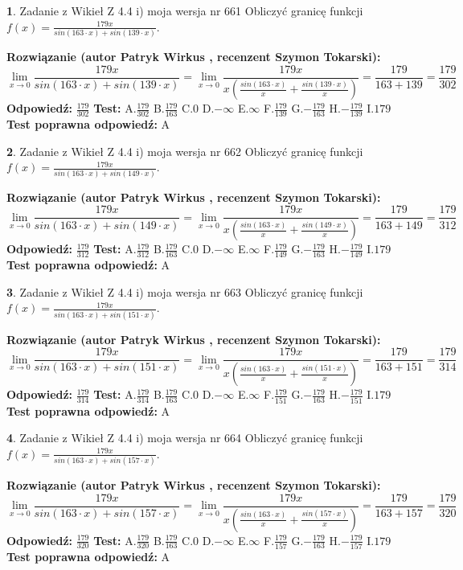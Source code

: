 \documentclass[12pt, a4paper]{article}
\theoremstyle{definition} %
\newtheorem{zad}{}
\newcommand{\zadStart}[1]{\begin{zad}#1\newline}
\newcommand{\zadStop}{\end{zad}}
\newcommand{\rozwStart}[2]{\noindent \textbf{Rozwiązanie (autor #1 , recenzent #2): }\newline}
\newcommand{\rozwStop}{\newline}
\newcommand{\odpStart}{\noindent \textbf{Odpowiedź:}\newline}
\newcommand{\odpStop}{\newline}
\newcommand{\testStart}{\noindent \textbf{Test:}\newline}
\newcommand{\testStop}{\newline}
\newcommand{\kluczStart}{\noindent \textbf{Test poprawna odpowiedź:}\newline}
\newcommand{\kluczStop}{\newline}
\begin{document}
\zadStart{Zadanie z Wikieł Z 4.4 i) moja wersja nr 661}
Obliczyć granicę funkcji $f(x)=\frac{179x}{sin(163\cdot x) +sin(139\cdot x)}$.
\zadStop
\rozwStart{Patryk Wirkus}{Szymon Tokarski}
$$\lim\limits_{x\to 0}\frac{179x}{sin(163\cdot x) +sin(139\cdot x)}=\lim\limits_{x\to 0}\frac{179x}{x(\frac{sin(163\cdot x)}{x}+\frac{sin(139\cdot x)}{x})}=\frac{179}{163+139} = \frac{179}{302}$$
\rozwStop
\odpStart
$\frac{179}{302}$
\odpStop
\testStart
A.$\frac{179}{302}$
B.$\frac{179}{163}$
C.$0$
D.$-\infty$
E.$\infty$
F.$\frac{179}{139}$
G.$-\frac{179}{163}$
H.$-\frac{179}{139}$
I.$179$
\testStop
\kluczStart
A
\kluczStop



\zadStart{Zadanie z Wikieł Z 4.4 i) moja wersja nr 662}
Obliczyć granicę funkcji $f(x)=\frac{179x}{sin(163\cdot x) +sin(149\cdot x)}$.
\zadStop
\rozwStart{Patryk Wirkus}{Szymon Tokarski}
$$\lim\limits_{x\to 0}\frac{179x}{sin(163\cdot x) +sin(149\cdot x)}=\lim\limits_{x\to 0}\frac{179x}{x(\frac{sin(163\cdot x)}{x}+\frac{sin(149\cdot x)}{x})}=\frac{179}{163+149} = \frac{179}{312}$$
\rozwStop
\odpStart
$\frac{179}{312}$
\odpStop
\testStart
A.$\frac{179}{312}$
B.$\frac{179}{163}$
C.$0$
D.$-\infty$
E.$\infty$
F.$\frac{179}{149}$
G.$-\frac{179}{163}$
H.$-\frac{179}{149}$
I.$179$
\testStop
\kluczStart
A
\kluczStop



\zadStart{Zadanie z Wikieł Z 4.4 i) moja wersja nr 663}
Obliczyć granicę funkcji $f(x)=\frac{179x}{sin(163\cdot x) +sin(151\cdot x)}$.
\zadStop
\rozwStart{Patryk Wirkus}{Szymon Tokarski}
$$\lim\limits_{x\to 0}\frac{179x}{sin(163\cdot x) +sin(151\cdot x)}=\lim\limits_{x\to 0}\frac{179x}{x(\frac{sin(163\cdot x)}{x}+\frac{sin(151\cdot x)}{x})}=\frac{179}{163+151} = \frac{179}{314}$$
\rozwStop
\odpStart
$\frac{179}{314}$
\odpStop
\testStart
A.$\frac{179}{314}$
B.$\frac{179}{163}$
C.$0$
D.$-\infty$
E.$\infty$
F.$\frac{179}{151}$
G.$-\frac{179}{163}$
H.$-\frac{179}{151}$
I.$179$
\testStop
\kluczStart
A
\kluczStop



\zadStart{Zadanie z Wikieł Z 4.4 i) moja wersja nr 664}
Obliczyć granicę funkcji $f(x)=\frac{179x}{sin(163\cdot x) +sin(157\cdot x)}$.
\zadStop
\rozwStart{Patryk Wirkus}{Szymon Tokarski}
$$\lim\limits_{x\to 0}\frac{179x}{sin(163\cdot x) +sin(157\cdot x)}=\lim\limits_{x\to 0}\frac{179x}{x(\frac{sin(163\cdot x)}{x}+\frac{sin(157\cdot x)}{x})}=\frac{179}{163+157} = \frac{179}{320}$$
\rozwStop
\odpStart
$\frac{179}{320}$
\odpStop
\testStart
A.$\frac{179}{320}$
B.$\frac{179}{163}$
C.$0$
D.$-\infty$
E.$\infty$
F.$\frac{179}{157}$
G.$-\frac{179}{163}$
H.$-\frac{179}{157}$
I.$179$
\testStop
\kluczStart
A
\kluczStop
\end{document}
